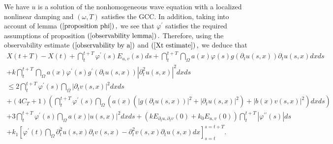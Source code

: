 \documentclass[11pt,reqno]{amsart}
\theoremstyle{plain}
\numberwithin{equation}{section}
\numberwithin{equation}{section}
\begin{document}
We have $u$ is a solution of the nonhomogeneous wave equation with a
localized nonlinear damping and $\left( \omega ,T\right) $ satisfies the
GCC. In addition, taking into account of lemma $\left( \ref{proposition phi}%
\right) ,$ we see that $\varphi ^{\prime }$ satisfies the required
assumptions of proposition $\left( \ref{observability lemma}\right) .$
Therefore, using the observability estimate $\left( \ref{observability by a}%
\right) $ and $\left( \ref{Xt estimate}\right) ,$ we deduce that 
\begin{equation}
\begin{array}{l}
X\left( t+T\right) -X\left( t\right) +\dint_{t}^{t+T}\varphi ^{\prime
}\left( s\right) E_{u,v}\left( s\right) ds+\dint_{t}^{t+T}\dint_{\Omega
}a\left( x\right) \varphi \left( s\right) g\left( \partial _{t}u\left(
s,x\right) \right) \partial _{t}u\left( s,x\right) dxds \\ 
+k\dint_{t}^{t+T}\dint_{\Omega }a\left( x\right) \varphi ^{\prime }\left(
s\right) g^{\prime }\left( \partial _{t}u\left( s,x\right) \right)
\left\vert \partial _{t}^{2}u\left( s,x\right) \right\vert ^{2}dxds \\ 
\leq 2\dint_{t}^{t+T}\varphi ^{\prime }\left( s\right) \dint_{\Omega
}\left\vert \partial _{t}v\left( s,x\right) \right\vert ^{2}dxds \\ 
+\left( 4C_{T}+1\right) \left( \dint_{t}^{t+T}\varphi ^{\prime }\left(
s\right) \dint_{\Omega }\left( a\left( x\right) \left( \left\vert g\left(
\partial _{t}u\left( s,x\right) \right) \right\vert ^{2}+\left\vert \partial
_{t}u\left( s,x\right) \right\vert ^{2}\right) +\left\vert b\left( x\right)
v\left( s,x\right) \right\vert ^{2}\right) dxds\right) \\ 
+3\dint_{t}^{t+T}\varphi ^{\prime }\left( s\right) \dint_{\Omega }a\left(
x\right) \left\vert u\left( s,x\right) \right\vert ^{2}dxds+\left(
kE_{\partial _{t}u,\partial _{t}v}\left( 0\right) +k_{0}E_{u,v}\left(
0\right) \right) \dint_{t}^{t+T}\left\vert \varphi ^{\prime \prime }\left(
s\right) \right\vert ds \\ 
+k_{1}\left[ \varphi ^{\prime }\left( t\right) \dint_{\Omega }\partial
_{t}^{2}u\left( s,x\right) \partial _{t}v\left( s,x\right) -\partial
_{t}^{2}v\left( s,x\right) \partial _{t}u\left( s,x\right) dx\right]
_{s=t}^{s=t+T}.%
\end{array}
\label{proof theorem Xt estimate}
\end{equation}
\end{document}
